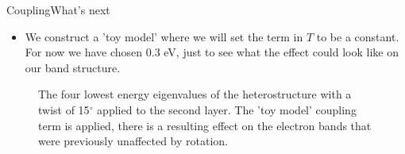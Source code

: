 \documentclass[9pt]{beamer}
\begin{document}
\begin{frame}{Coupling}{What's next}
  \begin{itemize}
    \item We construct a 'toy model' where we will set the term in $T$ to be a constant. For now we have chosen 0.3 eV, just to see what the effect could look like on our band structure.
  \end{itemize}

  \begin{figure}
    \centering
    \caption{The four lowest energy eigenvalues of the heterostructure with a twist of 15$^\circ$ applied to the second layer. The 'toy model' coupling term is applied, there is a resulting effect on the electron bands that were previously unaffected by rotation.}
  \end{figure}
\end{frame}
\end{document}
